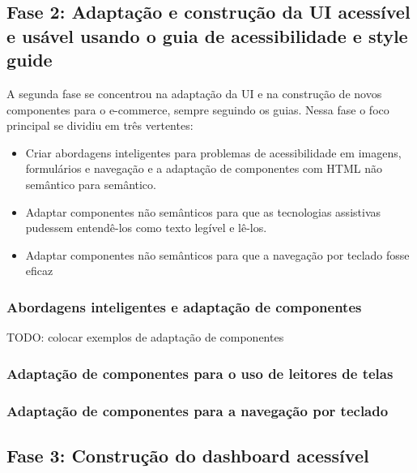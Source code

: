\subsection{Fase 2: Adaptação e construção da UI acessível e usável usando o guia de acessibilidade e style guide}
{A segunda fase se concentrou na adaptação da UI e na construção de novos componentes para o e-commerce, sempre seguindo os guias. Nessa fase o foco principal se dividiu em três vertentes:
\begin{itemize}
\item Criar abordagens inteligentes para problemas de acessibilidade em imagens, formulários e navegação e a
adaptação de componentes com HTML não semântico para semântico.
\item  Adaptar componentes não semânticos para que as tecnologias assistivas pudessem entendê-los como texto legível e lê-los.
\item  Adaptar componentes não semânticos para que a navegação por teclado fosse eficaz
\end{itemize}
}
\subsubsection{Abordagens inteligentes e adaptação de componentes}
{TODO: colocar exemplos de adaptação de componentes}
\subsubsection{Adaptação de componentes para o uso de leitores de telas}
\subsubsection{Adaptação de componentes para a navegação por teclado}

\subsection{Fase 3: Construção do dashboard acessível}

